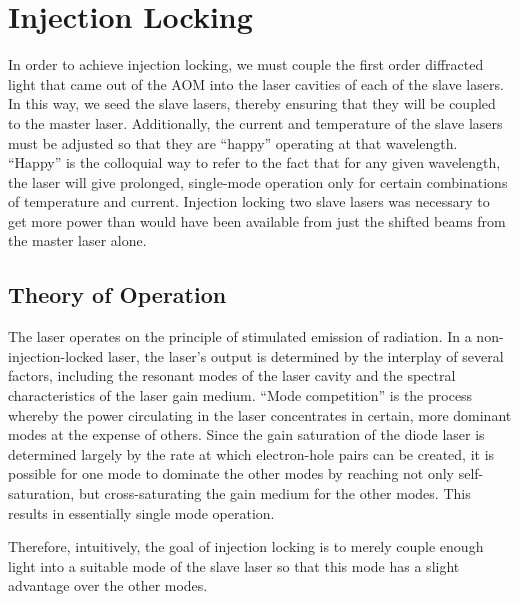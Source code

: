  \chapter{Injection Locking}\label{InjectionLockingChapter}


In order to achieve injection locking, we must couple the first order diffracted light that came out of the AOM into the laser cavities of each of the slave lasers. In this way, we seed the slave lasers, thereby ensuring that they will be coupled to the master laser. Additionally, the current and temperature of the slave lasers must be adjusted so that they are ``happy'' operating at that wavelength. ``Happy'' is the colloquial way to refer to the fact that for any given wavelength, the laser will give prolonged, single-mode operation only for certain combinations of temperature and current. 
Injection locking two slave lasers was necessary to get more power than would have been available from just the shifted beams from the master laser alone. 

\section{Theory of Operation}


The laser operates on the principle of stimulated emission of radiation. In a non-injection-locked laser, the laser's output is determined by the interplay of several factors, including the resonant modes of the laser cavity and the spectral characteristics of the laser gain medium.
``Mode competition'' is the process whereby the power circulating in the laser concentrates in certain, more dominant modes at the expense of others. Since the gain saturation of the diode laser is determined largely by the rate at which electron-hole pairs can be created, it is possible for one mode to dominate the other modes by reaching not only self-saturation, but cross-saturating the gain medium for the other modes\cite{RPPhotonicsEncyclopediaAndBuyersGuide}. This results in essentially single mode operation. 

Therefore, intuitively, the goal of injection locking is to merely couple enough light into a suitable mode of the slave laser so that this mode has a slight advantage over the other modes. 


